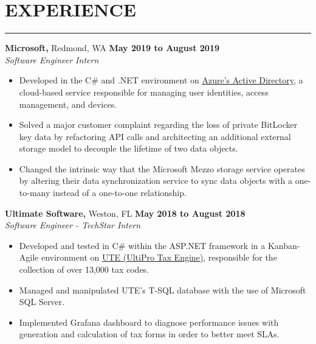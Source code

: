 \section*{EXPERIENCE}
		\hrule \relax
		\sectionheaderspace
		
		\noindent \textbf{Microsoft,} Redmond, WA \hfill\textbf{May 2019 to August 2019}\\
		\textit{Software Engineer Intern}
		\begin{itemize}[noitemsep,nolistsep, label = {-}]
			\item Developed in the C\# and .NET environment on \href{https://docs.microsoft.com/en-us/azure/active-directory/fundamentals/active-directory-whatis}{Azure's Active Directory}, a cloud-based service responsible for managing user identities, access management, and devices.
			\item Solved a major customer complaint regarding the loss of private BitLocker key data by refactoring API calls and architecting an additional external storage model to decouple the lifetime of two data objects.
			\item Changed the intrinsic way that the Microsoft Mezzo storage service operates by altering their data synchronization service to sync data objects with a one-to-many instead of a one-to-one relationship.
		\end{itemize}
	
		\vspace{.20cm}
		
		\noindent \textbf{Ultimate Software,} Weston, FL \hfill\textbf{May 2018 to August 2018}\\
		\textit{Software Engineer - TechStar Intern}
		\begin{itemize}[noitemsep,nolistsep, label = {-}]
			\item Developed and tested in C\# within the ASP.NET framework in a Kanban-Agile environment on \href{https://www.ultimatesoftware.com/UltiPro-Solution-Features-Payment-Services}{UTE (UltiPro Tax Engine)}, responsible for the collection of over 13,000 tax codes.
			\item Managed and manipulated UTE's T-SQL database with the use of Microsoft SQL Server.
			\item Implemented Grafana dashboard to diagnose performance issues with generation and calculation of tax forms in order to better meet SLAs.
		\end{itemize}
		\vspace{.20cm}
		
